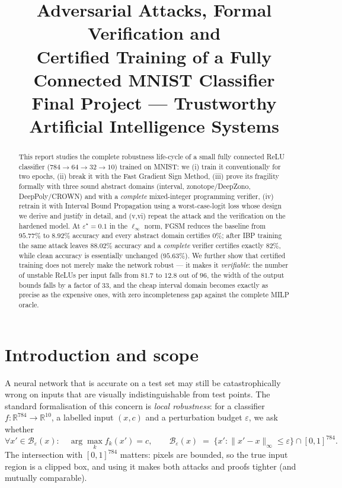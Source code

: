 \documentclass[11pt,a4paper]{article}
\title{\vspace{-1.2cm}\textbf{Adversarial Attacks, Formal Verification and\\
Certified Training of a Fully Connected MNIST Classifier}\\[2mm]
\large Final Project --- Trustworthy Artificial Intelligence Systems}
\author{}
\date{}
\newcommand{\eps}{\varepsilon}
\newcommand{\R}{\mathbb{R}}
\newcommand{\B}{\mathcal{B}}
\begin{document}
\maketitle
\vspace{-1.4cm}

\begin{abstract}
\noindent
This report studies the complete robustness life-cycle of a small fully
connected ReLU classifier ($784\!\to\!64\!\to\!32\!\to\!10$) trained on MNIST:
we (i) train it conventionally for two epochs, (ii) break it with the Fast
Gradient Sign Method, (iii) prove its fragility formally with three sound
abstract domains (interval, zonotope/DeepZono, DeepPoly/CROWN) and with a
\emph{complete} mixed-integer programming verifier, (iv) retrain it with
Interval Bound Propagation using a worst-case-logit loss whose design we derive
and justify in detail, and (v,vi) repeat the attack and the verification on the
hardened model. At $\eps^\star=0.1$ in the $\ell_\infty$ norm, FGSM reduces the
baseline from $95.77\%$ to $8.92\%$ accuracy and every abstract domain certifies
$0\%$; after IBP training the same attack leaves $88.02\%$ accuracy and a
\emph{complete} verifier certifies exactly $82\%$, while clean accuracy is
essentially unchanged ($95.63\%$). We further show that certified training does
not merely make the network robust --- it makes it \emph{verifiable}: the number
of unstable ReLUs per input falls from $81.7$ to $12.8$ out of $96$, the width of
the output bounds falls by a factor of $33$, and the cheap interval domain
becomes exactly as precise as the expensive ones, with zero incompleteness gap
against the complete MILP oracle.
\end{abstract}

\section{Introduction and scope}

A neural network that is accurate on a test set may still be catastrophically
wrong on inputs that are visually indistinguishable from test points. The
standard formalisation of this concern is \emph{local robustness}: for a
classifier $f:\R^{784}\to\R^{10}$, a labelled input $(x,c)$ and a perturbation
budget $\eps$, we ask whether
\begin{equation}
\forall x'\in\B_\eps(x):\quad \arg\max_k f_k(x') = c,
\qquad
\B_\eps(x) \;=\; \{x' : \|x'-x\|_\infty\le\eps\}\cap[0,1]^{784}.
\label{eq:spec}
\end{equation}
The intersection with $[0,1]^{784}$ matters: pixels are bounded, so the true
input region is a clipped box, and using it makes both attacks and proofs
tighter (and mutually comparable).
\end{document}
